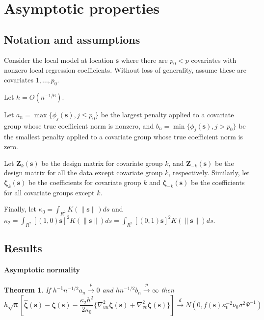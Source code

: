 \documentclass[authoryear, review, 11pt]{elsarticle}
\newtheorem{theorem}{Theorem}[section]
\begin{document}
    \section{Asymptotic properties}

        \subsection{Notation and assumptions}
        Consider the local model at location $\bm{s}$ where there are $p_0 < p$ covariates with nonzero local regression coefficients. Without loss of generality, assume these are covariates $1, \dots, p_0$.

        Let $h = O(n^{-1/6})$.
        
        Let $a_n = \max \{ \phi_j(\bm{s}), j \le p_0 \}$ be the largest penalty applied to a covariate group whose true coefficient norm is nonzero, and $b_n = \min \{ \phi_j(\bm{s}), j > p_0 \}$ be the smallest penalty applied to a covariate group whose true coefficient norm is zero.
        
        Let $\bm{Z}_k(\bm{s})$ be the design matrix for covariate group $k$, and $\bm{Z}_{-k}(\bm{s})$ be the design matrix for all the data except covariate group $k$, respectively. Similarly, let $\bm{\zeta}_k(\bm{s})$ be the coefficients for covariate group $k$ and $\bm{\zeta}_{-k}(\bm{s})$ be the coefficients for all covariate groups except $k$.

        Finally, let $\kappa_0 = \int_{R^2} K(\|\bm{s}\|) ds$ and $\kappa_2 = \int_{R^2} [(1,0)\bm{s}]^2 K(\|\bm{s}\|) ds = \int_{R^2} [(0,1)\bm{s}]^2 K(\|\bm{s}\|) ds$.

        \subsection{Results}
        \paragraph{Asymptotic normality}
        \begin{theorem} \label{theorem:normality} 
            If $h^{-1} n^{-1/2} a_n \xrightarrow{p} 0$ and $h n^{-1/2} b_n \xrightarrow{p} \infty$ then \[h \sqrt{n} \left[ \hat{\bm{\zeta}}(\bm{s}) - \bm{\zeta}(\bm{s}) - \frac{\kappa_2 h^2}{2 \kappa_0} \{ \nabla_{uu}^2 \bm{\zeta} (\bm{s}) + \nabla_{vv}^2 \bm{\zeta}(\bm{s}) \} \right] \xrightarrow{d} N(0, f(\bm{s}) \kappa_0^{-2} \nu_0 \sigma^2 \Psi^{-1} )\]
        \end{theorem}
  
\end{document}
